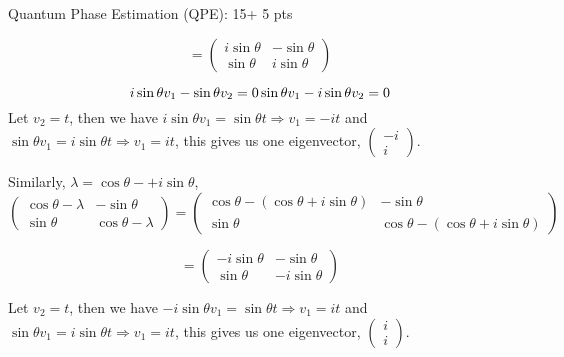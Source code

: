 \documentclass[12pt]{article}
\makeatletter
\newcommand{\<}{\langle}
\renewcommand{\>}{\rangle}
\newenvironment{problem}{\@startsection
       {section}
       {1}
       {-.2em}
       {-3.5ex plus -1ex minus -.2ex}
       {2.3ex plus .2ex}
       {\pagebreak[3]
       \large\bf\noindent{Problem }
       }
       }
       {%
       \begin{center}\large\bf \end{center}}
\makeatother
\begin{document}
\begin{problem}{Quantum Phase Estimation (QPE): 15+ 5 pts}
\begin{enumerate}
      $$= \left(\begin{array}{cc}
		i\sin\theta & -\sin \theta\\
		\sin \theta & i\sin\theta
		\end{array}
      \right) $$
      
      $$
      i\sin\theta v_1 - \sin\theta v_2 = 0\\
      \sin\theta v_1 - i\sin\theta v_2 = 0
      $$
      Let $v_2 = t$, then we have $i\sin\theta v_1 = \sin \theta t \Rightarrow v_1 = -it$ and $\sin\theta v_1 = i\sin \theta t \Rightarrow v_1 = it$, this gives us one eigenvector, $\left(\begin{array}{c}-i\\i\end{array}\right)$.
      
Similarly, $\lambda = \cos\theta -+ i\sin\theta$, 
	$$\left(\begin{array}{cc}
		\cos \theta -\lambda & -\sin \theta\\
		\sin \theta & \cos \theta - \lambda	
		\end{array}
      \right)  =  \left(\begin{array}{cc}
		\cos \theta -(\cos\theta + i\sin\theta) & -\sin \theta\\
		\sin \theta & \cos \theta - (\cos\theta + i\sin\theta)	
		\end{array}
      \right)$$
      
      $$= \left(\begin{array}{cc}
		-i\sin\theta & -\sin \theta\\
		\sin \theta & -i\sin\theta	
		\end{array}
      \right) $$
      
      Let $v_2 = t$, then we have $-i\sin\theta v_1 = \sin \theta t \Rightarrow v_1 = it$ and $\sin\theta v_1 = i\sin \theta t \Rightarrow v_1 = it$, this gives us one eigenvector, $\left(\begin{array}{c}i\\i\end{array}\right)$.
      
\end{enumerate}

\end{problem}
\end{document}
